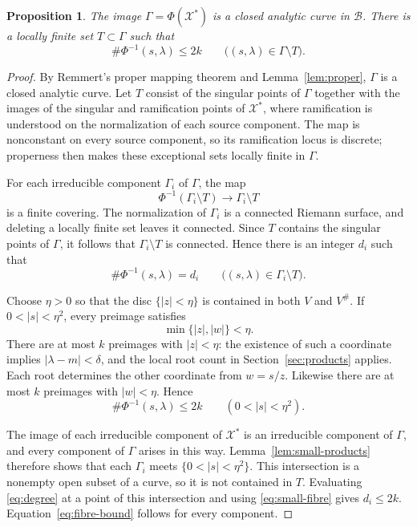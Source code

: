 \documentclass[11pt]{article}
\newtheorem{proposition}[theorem]{Proposition}
\theoremstyle{remark}
\numberwithin{equation}{section}
\newcommand{\X}{\mathcal X}
\newcommand{\B}{\mathcal B}
\begin{document}
\begin{proposition}\label{prop:degree}
The image \(\Gamma=\Phi(\X^*)\) is a closed analytic curve in \(\B\).
There is a locally finite set \(T\subset\Gamma\) such that
\begin{equation}\label{eq:fibre-bound}
 \#\Phi^{-1}(s,\lambda)\le2k
 \qquad\bigl((s,\lambda)\in\Gamma\setminus T\bigr).
\end{equation}
\end{proposition}

\begin{proof}
By Remmert's proper mapping theorem and Lemma~\ref{lem:proper},
\(\Gamma\) is a closed analytic curve.
Let \(T\) consist of the singular points of \(\Gamma\) together with
the images of the singular and ramification points of \(\X^*\), where
ramification is understood on the normalization of each source
component. The map is nonconstant on every source component, so its
ramification locus is discrete; properness then makes these exceptional
sets locally finite in \(\Gamma\).

For each irreducible component \(\Gamma_i\) of \(\Gamma\), the map
\[
 \Phi^{-1}(\Gamma_i\setminus T)\longrightarrow\Gamma_i\setminus T
\]
is a finite covering. The normalization of \(\Gamma_i\) is a connected
Riemann surface, and deleting a locally finite set leaves it connected.
Since \(T\) contains the singular points of \(\Gamma\), it follows that
\(\Gamma_i\setminus T\) is connected. Hence there is an integer
\(d_i\) such that
\begin{equation}\label{eq:degree}
 \#\Phi^{-1}(s,\lambda)=d_i
 \qquad\bigl((s,\lambda)\in\Gamma_i\setminus T\bigr).
\end{equation}

Choose \(\eta>0\) so that the disc \(\{|z|<\eta\}\) is contained
in both \(V\) and \(V^\#\).
If \(0<|s|<\eta^2\), every preimage satisfies
\[
 \min\{|z|,|w|\}<\eta.
\]
There are at most \(k\) preimages with \(|z|<\eta\): the existence
of such a coordinate implies \(|\lambda-m|<\delta\), and the local
root count in Section~\ref{sec:products} applies. Each root determines
the other coordinate from \(w=s/z\).
Likewise there are at most \(k\) preimages with \(|w|<\eta\).
Hence
\begin{equation}\label{eq:small-fibre}
 \#\Phi^{-1}(s,\lambda)\le2k
 \qquad(0<|s|<\eta^2).
\end{equation}

The image of each irreducible component of \(\X^*\) is an
irreducible component of \(\Gamma\), and every component of
\(\Gamma\) arises in this way.
Lemma~\ref{lem:small-products} therefore shows that each \(\Gamma_i\)
meets \(\{0<|s|<\eta^2\}\).
This intersection is a nonempty open subset of a curve, so it is
not contained in \(T\).
Evaluating \eqref{eq:degree} at a point of this intersection and
using \eqref{eq:small-fibre} gives \(d_i\le2k\).
Equation~\eqref{eq:fibre-bound} follows for every component.
\end{proof}
\end{document}
